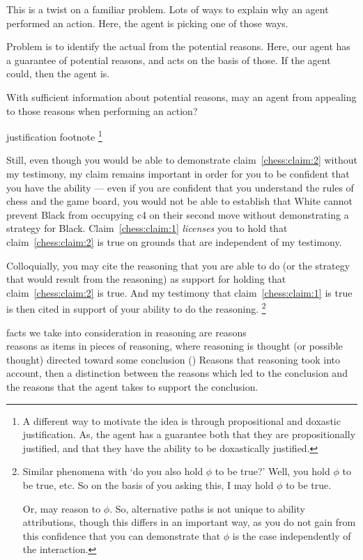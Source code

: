 \documentclass[10pt]{article}
\begin{document}
\begin{note}
  This is a twist on a familiar problem.
  Lots of ways to explain why an agent performed an action.
  Here, the agent is picking one of those ways.

  Problem is to identify the actual from the potential reasons.
  Here, our agent has a guarantee of potential reasons, and acts on the basis of those.
  If the agent could, then the agent is.

  With sufficient information about potential reasons, may an agent from appealing to those reasons when performing an action?

  justification footnote\nolinebreak
  \footnote{
    A different way to motivate the idea is through propositional and doxastic justification.
    As, the agent has a guarantee both that they are propositionally justified, and that they have the ability to be doxastically justified.
  }
\end{note}

Still, even though you would be able to demonstrate claim~\ref{chess:claim:2} without my testimony, my claim remains important in order for you to be confident that you have the ability --- even if you are confident that you understand the rules of chess and the game board, you would not be able to establish that White cannot prevent Black from occupying c4 on their second move without demonstrating a strategy for Black.
Claim~\ref{chess:claim:1} \emph{licenses} you to hold that claim~\ref{chess:claim:2} is true on grounds that are independent of my testimony.

Colloquially, you may cite the reasoning that you are able to do (or the strategy that would result from the reasoning) as support for holding that claim~\ref{chess:claim:2} is true.
And my testimony that claim~\ref{chess:claim:1} is true is then cited in support of your ability to do the reasoning.\nolinebreak
\footnote{
  Similar phenomena with `do you also hold \(\phi\) to be true?'
  Well, you hold \(\phi\) to be true, etc.
  So on the basis of you asking this, I may hold \(\phi\) to be true.

  Or, may reason to \(\phi\).
  So, alternative paths is not unique to ability attributions, though this differs in an important way, as you do not gain from this confidence that you can demonstrate that \(\phi\) is the case independently of the interaction.
}

  {
    \color{red}
    facts we take into consideration in reasoning are reasons \\
    reasons as items in pieces of reasoning, where reasoning is thought (or possible thought) directed toward some conclusion (\citeyear[421]{Hieronymi:2011aa})
  }
  Reasons that reasoning took into account, then a distinction between the reasons which led to the conclusion and the reasons that the agent takes to support the conclusion.
\end{document}
